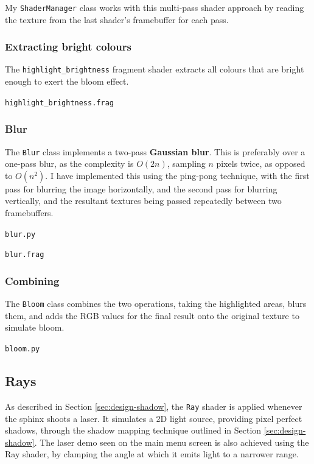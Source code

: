 \documentclass[../main/main.tex]{subfiles}
\begin{document}
My \lstinline{ShaderManager} class works with this multi-pass shader approach by reading the texture from the last shader's framebuffer for each pass.

\subsubsection*{Extracting bright colours}
The \lstinline{highlight_brightness} fragment shader extracts all colours that are bright enough to exert the bloom effect.

\noindent\verb|highlight_brightness.frag|


\subsubsection*{Blur}
The \lstinline{Blur} class implements a two-pass \textbf{Gaussian blur}. This is preferably over a one-pass blur, as the complexity is $O(2n)$, sampling $n$ pixels twice, as opposed to $O(n^2)$. I have implemented this using the ping-pong technique, with the first pass for blurring the image horizontally, and the second pass for blurring vertically, and the resultant textures being passed repeatedly between two framebuffers.

\noindent\verb|blur.py|


\bigskip
\noindent\verb|blur.frag|


\subsubsection*{Combining}
The \lstinline{Bloom} class combines the two operations, taking the highlighted areas, blurs them, and adds the RGB values for the final result onto the original texture to simulate bloom.

\noindent\verb|bloom.py|


\subsection{Rays}
\label{sec:shader-rays}
As described in Section \ref{sec:design-shadow}, the \lstinline{Ray} shader is applied whenever the sphinx shoots a laser. It simulates a 2D light source, providing pixel perfect shadows, through the shadow mapping technique outlined in Section \ref{sec:design-shadow}. The laser demo seen on the main menu screen is also achieved using the Ray shader, by clamping the angle at which it emits light to a narrower range.
\end{document}
